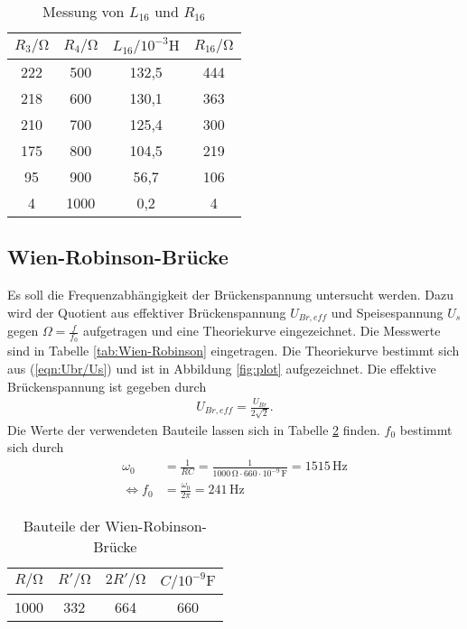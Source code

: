 \begin{table}
  \centering
  \caption{Messung von $L_{16}$ und $R_{16}$}
  \label{tab:Cx,Rx,Maxwell}
  \begin{tabular}{c c c c}
    \toprule
    $R_3/\unit{\ohm}$ & $R_4/\unit{\ohm}$ & $L_{16}/10^{-3}\unit{\henry}$ & $R_{16}/\unit{\ohm}$ \\
    \midrule
    222 &  500 &  132,5 & 444 \\
    218 &  600 &  130,1 & 363 \\
    210 &  700 &  125,4 & 300 \\
    175 &  800 &  104,5 & 219 \\
     95 &  900 &   56,7 & 106 \\
      4 & 1000 &    0,2 &   4 \\
    \bottomrule
  \end{tabular}
\end{table}

\subsection{Wien-Robinson-Brücke}
Es soll die Frequenzabhängigkeit der Brückenspannung untersucht werden. Dazu wird der Quotient aus effektiver Brückenspannung $U_{Br,eff}$ und Speisespannung $U_s$
gegen $\Omega = \frac{f}{f_0}$ aufgetragen und eine Theoriekurve eingezeichnet. Die Messwerte sind in Tabelle \ref{tab:Wien-Robinson} eingetragen.
Die Theoriekurve bestimmt sich aus (\ref{eqn:Ubr/Us}) und ist in Abbildung \ref{fig:plot} aufgezeichnet. Die effektive Brückenspannung ist gegeben durch
\begin{align*}
  U_{Br,eff} = \frac{U_{Br}}{2\sqrt{2}}.
\end{align*}
Die Werte der verwendeten Bauteile lassen sich in Tabelle \ref{tab:Bauteile} finden. $f_0$ bestimmt sich durch
\begin{align*}
  \omega_0 &= \frac{1}{RC} = \frac{1}{1000\,\unit{\ohm}\cdot 660 \cdot 10^{-9} \,\unit{\farad}} = 1515\,\unit{\hertz} \\
  \iff f_0 &= \frac{\omega_0}{2\pi} = 241\,\unit{\hertz}
\end{align*}

\begin{table}
  \centering
  \caption{Bauteile der Wien-Robinson-Brücke}
  \label{tab:Bauteile}
  \begin{tabular}{c c c c}
    \toprule
    $R/\unit{\ohm}$ & $R'/\unit{\ohm}$ & $2R'/\unit{\ohm}$ & $C/10^{-9}\unit{\farad}$ \\
    \midrule
    1000 & 332 & 664 & 660 \\
    \bottomrule
  \end{tabular}
\end{table}

